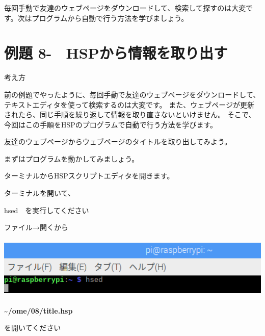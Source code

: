 \documentclass[a4paper,12pt,dvipdfmx]{jarticle}
\newcounter{Exercise}
\renewcommand\theExercise{例題 8-\arabic{Exercise}}
\begin{document}
\bigskip

毎回手動で友達のウェブページをダウンロードして、検索して探すのは大変です。次はプログラムから自動で行う方法を学びましょう。
\clearpage\section{\theExercise　HSPから情報を取り出す}
\addtocounter{Exercise}{-1}\label{E:SCRAPING}
考え方

前の例題でやったように、毎回手動で友達のウェブページをダウンロードして、テキストエディタを使って検索するのは大変です。
また、ウェブページが更新されたら、同じ手順を繰り返して情報を取り直さないといけません。
そこで、今回はこの手順をHSPのプログラムで自動で行う方法を学びます。

友達のウェブページからウェブページのタイトルを取り出してみよう。

まずはプログラムを動かしてみましょう。

ターミナルからHSPスクリプトエディタを開きます。

ターミナルを開いて、

hsed　を実行してください

ファイル→開くから

\begin{center}
\includegraphics[width=16.94cm,height=2.944cm]{textbook-img013.png}

\end{center}
\textbf{\~{}/ome/08/title.hsp}

を開いてください
\end{document}
